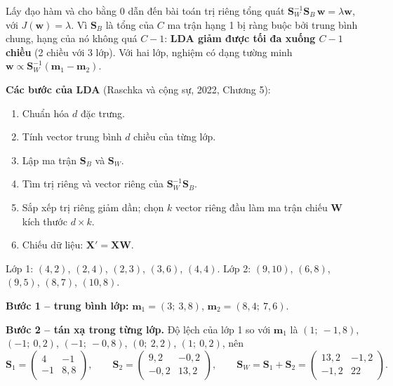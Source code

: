 Lấy đạo hàm và cho bằng 0 dẫn đến bài toán trị riêng tổng quát $\mathbf{S}_W^{-1}\mathbf{S}_B\,\mathbf{w} = \lambda\mathbf{w}$, với $J(\mathbf{w}) = \lambda$. Vì $\mathbf{S}_B$ là tổng của $C$ ma trận hạng 1 bị ràng buộc bởi trung bình chung, hạng của nó không quá $C - 1$: \textbf{LDA giảm được tối đa xuống $C - 1$ chiều} (2 chiều với 3 lớp). Với hai lớp, nghiệm có dạng tường minh $\mathbf{w} \propto \mathbf{S}_W^{-1}(\mathbf{m}_1 - \mathbf{m}_2)$.

\noindent\textbf{Các bước của LDA} (Raschka và cộng sự, 2022, Chương 5):
\begin{enumerate}
    \item Chuẩn hóa $d$ đặc trưng.
    \item Tính vector trung bình $d$ chiều của từng lớp.
    \item Lập ma trận $\mathbf{S}_B$ và $\mathbf{S}_W$.
    \item Tìm trị riêng và vector riêng của $\mathbf{S}_W^{-1}\mathbf{S}_B$.
    \item Sắp xếp trị riêng giảm dần; chọn $k$ vector riêng đầu làm ma trận chiếu $\mathbf{W}$ kích thước $d \times k$.
    \item Chiếu dữ liệu: $\mathbf{X}' = \mathbf{X}\mathbf{W}$.
\end{enumerate}

\begin{example}
Lớp 1: $(4, 2)$, $(2, 4)$, $(2, 3)$, $(3, 6)$, $(4, 4)$. Lớp 2: $(9, 10)$, $(6, 8)$, $(9, 5)$, $(8, 7)$, $(10, 8)$.
\end{example}

\noindent\textbf{Bước 1 -- trung bình lớp:} $\mathbf{m}_1 = (3;\ 3{,}8)$, $\mathbf{m}_2 = (8{,}4;\ 7{,}6)$.

\noindent\textbf{Bước 2 -- tán xạ trong từng lớp.} Độ lệch của lớp 1 so với $\mathbf{m}_1$ là $(1;\ -1{,}8)$, $(-1;\ 0{,}2)$, $(-1;\ -0{,}8)$, $(0;\ 2{,}2)$, $(1;\ 0{,}2)$, nên
\[
    \mathbf{S}_1 = \begin{pmatrix} 4 & -1 \\ -1 & 8{,}8 \end{pmatrix}, \qquad
    \mathbf{S}_2 = \begin{pmatrix} 9{,}2 & -0{,}2 \\ -0{,}2 & 13{,}2 \end{pmatrix}, \qquad
    \mathbf{S}_W = \mathbf{S}_1 + \mathbf{S}_2 = \begin{pmatrix} 13{,}2 & -1{,}2 \\ -1{,}2 & 22 \end{pmatrix}.
\]


